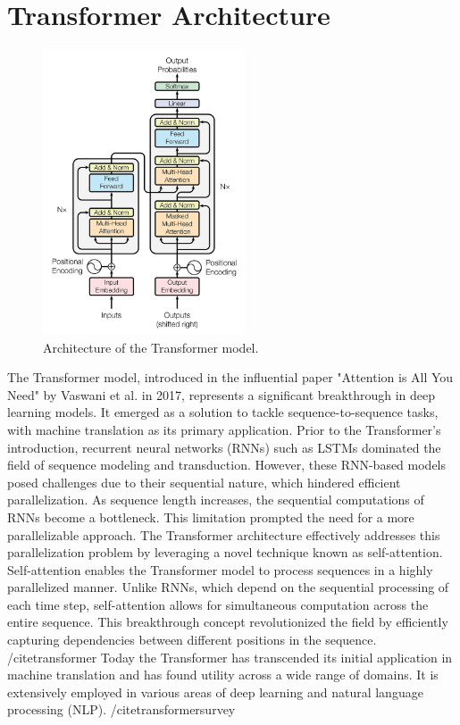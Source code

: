 \documentclass[a4paper,12pt]{report} %
\begin{document}
\section{Transformer Architecture}
\begin{figure}
  \centering
  \includegraphics[width=6cm]{img/transformer.png}
  \caption{Architecture of the Transformer model.}
  \label{fig:transformer}
\end{figure}
The Transformer model, introduced in the influential paper "Attention is All You Need" by Vaswani et al. in 2017, represents a significant breakthrough in deep learning models. It emerged as a solution to tackle sequence-to-sequence tasks, with machine translation as its primary application. Prior to the Transformer's introduction, recurrent neural networks (RNNs) such as LSTMs dominated the field of sequence modeling and transduction. However, these RNN-based models posed challenges due to their sequential nature, which hindered efficient parallelization. As sequence length increases, the sequential computations of RNNs become a bottleneck. This limitation prompted the need for a more parallelizable approach. The Transformer architecture effectively addresses this parallelization problem by leveraging a novel technique known as self-attention. Self-attention enables the Transformer model to process sequences in a highly parallelized manner. Unlike RNNs, which depend on the sequential processing of each time step, self-attention allows for simultaneous computation across the entire sequence. This breakthrough concept revolutionized the field by efficiently capturing dependencies between different positions in the sequence. /cite{transformer} Today the Transformer has transcended its initial application in machine translation and has found utility across a wide range of domains. It is extensively employed in various areas of deep learning and natural language processing (NLP). /cite{transformersurvey}
\end{document}

